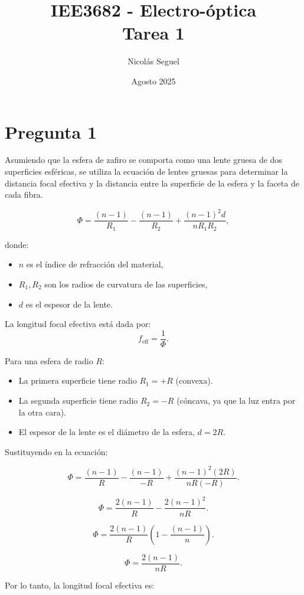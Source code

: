 \documentclass[11pt]{article}
\title{IEE3682 - Electro-óptica \\
Tarea 1}
\author{Nicolás Seguel}
\date{Agosto 2025}
\begin{document}
\maketitle

\section*{Pregunta 1}

Asumiendo que la esfera de zafiro se comporta como una lente gruesa de dos superficies esféricas, se utiliza la ecuación de lentes gruesas para determinar la distancia focal efectiva y la distancia entre la superficie de la esfera y la faceta de cada fibra.

\[
\Phi = \frac{(n-1)}{R_1} - \frac{(n-1)}{R_2} + \frac{(n-1)^2 d}{n R_1 R_2},
\]

donde:
\begin{itemize}
    \item $n$ es el índice de refracción del material,
    \item $R_1, R_2$ son los radios de curvatura de las superficies,
    \item $d$ es el espesor de la lente.
\end{itemize}

La longitud focal efectiva está dada por:
\[
f_{\text{eff}} = \frac{1}{\Phi}.
\]

Para una esfera de radio $R$:

\begin{itemize}
    \item La primera superficie tiene radio $R_1 = +R$ (convexa).
    \item La segunda superficie tiene radio $R_2 = -R$ (cóncava, ya que la luz entra por la otra cara).
    \item El espesor de la lente es el diámetro de la esfera, $d = 2R$.
\end{itemize}

Sustituyendo en la ecuación:

\[
\Phi = \frac{(n-1)}{R} - \frac{(n-1)}{-R} + \frac{(n-1)^2 (2R)}{n R (-R)}.
\]

\[
\Phi = \frac{2(n-1)}{R} - \frac{2(n-1)^2}{nR}.
\]

\[
\Phi = \frac{2(n-1)}{R}\left(1 - \frac{(n-1)}{n}\right).
\]

\[
\Phi = \frac{2(n-1)}{nR}.
\]

Por lo tanto, la longitud focal efectiva es:
\end{document}
